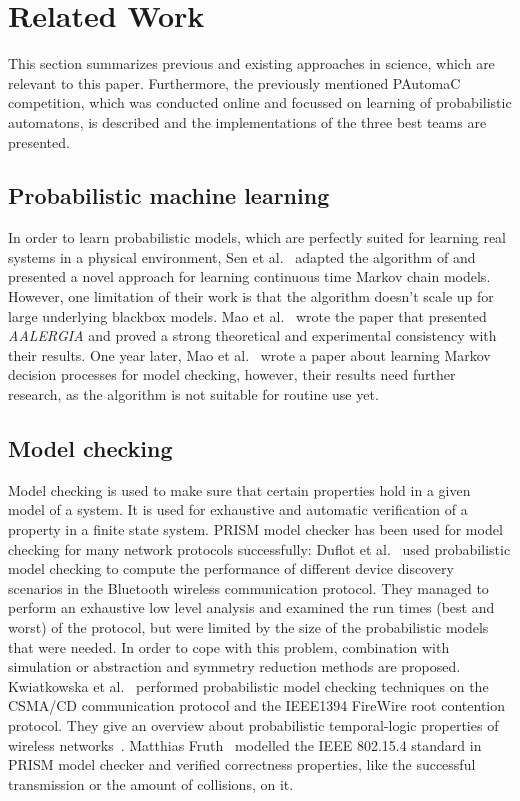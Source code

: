 \documentclass[
a4paper,
12pt
]{scrartcl}
\begin{document}
\newpage
\section{Related Work}
This section summarizes previous and existing approaches in science, which are relevant to this paper. Furthermore, the previously mentioned PAutomaC competition, which was conducted online and focussed on learning of probabilistic automatons, is described and the implementations of the three best teams are presented.

\subsection{Probabilistic machine learning}
In order to learn probabilistic models, which are perfectly suited for learning real systems in a physical environment, Sen et al.~\cite{Sen2004} adapted the algorithm of \cite{Carrasco.1994} and presented a novel approach for learning continuous time Markov chain models. However, one limitation of their work is that the algorithm doesn't scale up for large underlying blackbox models. Mao et al.~\cite{Mao.} wrote the paper that presented \emph{AALERGIA} and proved a strong theoretical and experimental consistency with their results. One year later, Mao et al.~\cite{Mao.2012} wrote a paper about learning Markov decision processes for model checking, however, their results need further research, as the algorithm is not suitable for routine use yet.

\subsection{Model checking}
Model checking is used to make sure that certain properties hold in a given model of a system. It is used for exhaustive and automatic verification of a property in a finite state system. PRISM model checker has been used for model checking for many network protocols successfully: Duflot et al.~\cite{DKNP06} used probabilistic model checking to compute the performance of different device discovery scenarios in the Bluetooth wireless communication protocol. They managed to perform an exhaustive low level analysis and examined the run times (best and worst) of the protocol, but were limited by the size of the probabilistic models that were needed. In order to cope with this problem, combination with simulation or abstraction and symmetry reduction methods are proposed.
Kwiatkowska et al.~\cite{KNSW07} performed probabilistic model checking techniques on the CSMA/CD communication protocol and the IEEE1394 FireWire root contention protocol. They give an overview about probabilistic temporal-logic properties of wireless networks~\cite{KNP09a}.
Matthias Fruth~\cite{Fru06} modelled the IEEE 802.15.4 standard in PRISM model checker and verified correctness properties, like the successful transmission or the amount of collisions, on it.
\end{document}
